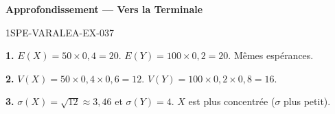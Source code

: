 \begin{center}\textbf{Approfondissement — Vers la Terminale}\end{center}
\begin{corrige}{1SPE-VARALEA-EX-037}

\textbf{1.} $E(X) = 50 \times 0{,}4 = 20$. \quad $E(Y) = 100 \times 0{,}2 = 20$. Mêmes espérances.

\medskip
\textbf{2.} $V(X) = 50 \times 0{,}4 \times 0{,}6 = 12$. \quad $V(Y) = 100 \times 0{,}2 \times 0{,}8 = 16$.

\medskip
\textbf{3.} $\sigma(X) = \sqrt{12} \approx 3{,}46$ et $\sigma(Y) = 4$. $X$ est plus concentrée ($\sigma$ plus petit).

\end{corrige}
